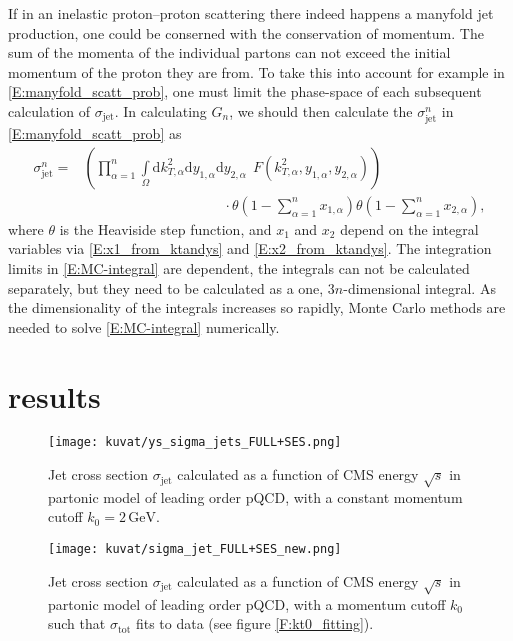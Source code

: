 \documentclass[a4paper, twoside, english, 12pt]{article}
\begin{document}
If in an inelastic proton--proton scattering there indeed happens a manyfold jet production, one could be conserned with the conservation of momentum. The sum of the momenta of the individual partons can not exceed the initial momentum of the proton they are from. To take this into account for example in \eqref{E:manyfold_scatt_prob}, one must limit the phase-space of each subsequent calculation of $\sigma_\text{jet}$. In calculating $G_n$, we should then calculate the $\sigma_\text{jet}^n$ in \eqref{E:manyfold_scatt_prob} as
\begin{align}\label{E:MC-integral}
\sigma_\text{jet}^n = &\left(\prod\limits_{\alpha=1}^{n} \int\limits_{\Omega} \textstyle\text{d}k_{T,\alpha}^2\text{d}y_{1,\alpha}\text{d}y_{2,\alpha} \displaystyle\:\:  F\left(k_{T,\alpha}^2,y_{1,\alpha},y_{2,\alpha}\right)\right)\nonumber\\[0.6em]
&\qquad\qquad\qquad\qquad\qquad\cdot\theta\left(1-\sum\limits_{\alpha=1}^{n}x_{1,\alpha}\right)\theta\left(1-\sum\limits_{\alpha=1}^{n}x_{2,\alpha}\right),
\end{align}
where $\theta$ is the Heaviside step function, and $x_1$ and $x_2$ depend on the integral variables via \eqref{E:x1_from_ktandys} and \eqref{E:x2_from_ktandys}. The integration limits in \eqref{E:MC-integral} are dependent, the integrals can not be calculated separately, but they need to be calculated as a one, $3n$-dimensional integral. As the dimensionality of the integrals increases so rapidly, Monte Carlo methods are needed to solve \eqref{E:MC-integral} numerically.




\section{results}

\begin{figure}[htb!]
	\centering
	\texttt{[image: kuvat/ys\_sigma\_jets\_FULL+SES.png]}
	\caption{Jet cross section $\sigma_{\text{jet}}$ calculated as a function of CMS energy $\sqrt{s}$ in partonic model of leading order pQCD, with a constant momentum cutoff $k_0 = 2\,\text{GeV}$.}
	\label{F:FULL_vs_SES_const_kt0}
\end{figure}

\begin{figure}[htb!]
	\centering
	\texttt{[image: kuvat/sigma\_jet\_FULL+SES\_new.png]}
	\caption{Jet cross section $\sigma_{\text{jet}}$ calculated as a function of CMS energy $\sqrt{s}$ in partonic model of leading order pQCD, with a momentum cutoff $k_0$ such that $\sigma_{\text{tot}}$ fits to data (see figure \ref{F:kt0_fitting}).}
	\label{F:FULL_vs_SES}
\end{figure}
\end{document}
